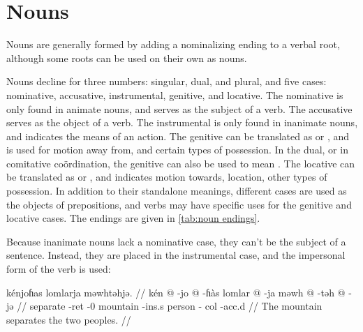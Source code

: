 \section{Nouns}

Nouns are generally formed by adding a nominalizing ending to a verbal root,
although some roots can be used on their own as nouns.

Nouns decline for three numbers: singular, dual, and plural, and five cases:
nominative, accusative, instrumental, genitive, and locative.
The nominative is only found in animate nouns, and serves as the subject of a
verb.
The accusative serves as the object of a verb.
The instrumental is only found in inanimate nouns, and indicates the means of
an action.
The genitive can be translated as  or , and is used for motion
away from, and certain types of possession.
In the dual, or in comitative coördination, the genitive can also be used to
mean .
The locative can be translated as  or , and indicates motion
towards, location, other types of possession.
In addition to their standalone meanings, different cases are used as the
objects of prepositions, and verbs may have specific uses for the genitive and
locative cases.
The endings are given in \cref{tab:noun endings}.

Because inanimate nouns lack a nominative case, they can't be the subject of a
sentence.
Instead, they are placed in the instrumental case, and the impersonal form of
the verb is used:

\ex
\begingl
    \glpreamble kénjoɦas lomlarja məwhtəhjə. //
    \gla kén @ -jo @ -ɦàs lomlar @ -ja məwh @ -təh @ -jə //
    \glb separate -{\sc ret} -0 mountain -{\sc ins}.s person -{\sc
        col} -{\sc acc}.d //
    \glft The mountain separates the two peoples. //
\endgl
\xe

